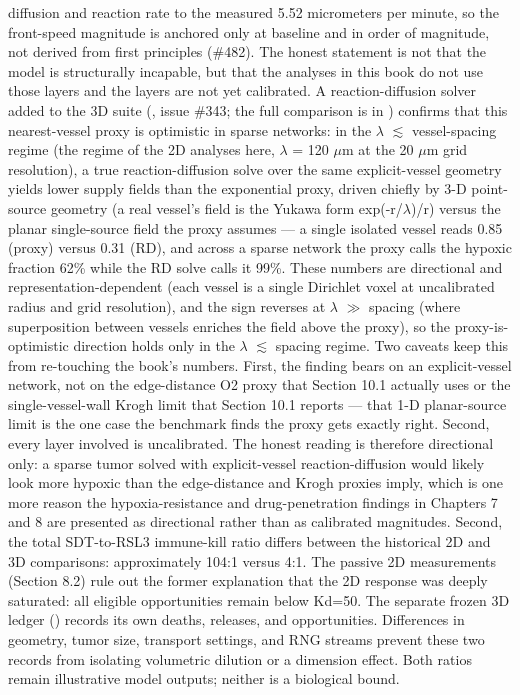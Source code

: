 \documentclass[11pt,twoside,openright]{report}
\begin{document}
diffusion and reaction rate to the measured 5.52 micrometers per minute, so the front-speed magnitude is anchored only at baseline and in order of magnitude, not derived from first principles (\#482). The honest statement is not that the model is structurally incapable, but that the analyses in this book do not use those layers and the layers are not yet calibrated. A reaction-diffusion solver added to the 3D suite (, issue \#343; the full comparison is in ) confirms that this nearest-vessel proxy is optimistic in sparse networks: in the $\lambda$ $\lesssim$ vessel-spacing regime (the regime of the 2D analyses here, $\lambda$ = 120 $\mu$m at the 20 $\mu$m grid resolution), a true reaction-diffusion solve over the same explicit-vessel geometry yields lower supply fields than the exponential proxy, driven chiefly by 3-D point-source geometry (a real vessel's field is the Yukawa form exp(-r/$\lambda$)/r) versus the planar single-source field the proxy assumes --- a single isolated vessel reads 0.85 (proxy) versus 0.31 (RD), and across a sparse network the proxy calls the hypoxic fraction 62\% while the RD solve calls it 99\%. These numbers are directional and representation-dependent (each vessel is a single Dirichlet voxel at uncalibrated radius and grid resolution), and the sign reverses at $\lambda$ $\gg$ spacing (where superposition between vessels enriches the field above the proxy), so the proxy-is-optimistic direction holds only in the $\lambda$ $\lesssim$ spacing regime. Two caveats keep this from re-touching the book's numbers. First, the finding bears on an explicit-vessel network, not on the edge-distance O2 proxy that Section 10.1 actually uses or the single-vessel-wall Krogh limit that Section 10.1 reports --- that 1-D planar-source limit is the one case the benchmark finds the proxy gets exactly right. Second, every layer involved is uncalibrated. The honest reading is therefore directional only: a sparse tumor solved with explicit-vessel reaction-diffusion would likely look more hypoxic than the edge-distance and Krogh proxies imply, which is one more reason the hypoxia-resistance and drug-penetration findings in Chapters 7 and 8 are presented as directional rather than as calibrated magnitudes. Second, the total SDT-to-RSL3 immune-kill ratio differs between the historical 2D and 3D comparisons: approximately 104:1 versus 4:1. The passive 2D measurements (Section 8.2) rule out the former explanation that the 2D response was deeply saturated: all eligible opportunities remain below Kd=50. The separate frozen 3D ledger () records its own deaths, releases, and opportunities. Differences in geometry, tumor size, transport settings, and RNG streams prevent these two records from isolating volumetric dilution or a dimension effect. Both ratios remain illustrative model outputs; neither is a biological bound.
\end{document}
